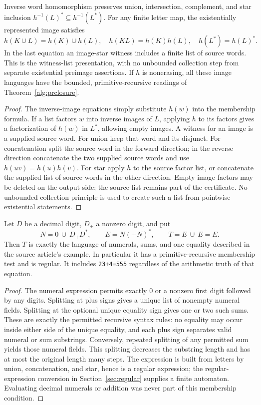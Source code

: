 \begin{theorem}
\label{alg:homlaws}
Inverse word homomorphism preserves union, intersection, complement, and
star inclusion $h^{-1}(L)^*\subseteq h^{-1}(L^*)$. For any finite letter
map, the existentially represented image satisfies
\[
 h(K\cup L)=h(K)\cup h(L),\quad h(KL)=h(K)h(L),\quad
 h(L^*)=h(L)^*.
\]
In the last equation an image-star witness includes a finite list of source
words. This is the witness-list presentation, with no unbounded collection
step from separate existential preimage assertions. If $h$ is nonerasing,
all these image languages have the bounded,
primitive-recursive readings of Theorem~\ref{alg:prclosure}.
\end{theorem}
\begin{proof}
The inverse-image equations simply substitute $h(w)$ into the membership
formula. If a list factors $w$ into inverse images of $L$, applying $h$
to its factors gives a factorization of $h(w)$ in $L^*$, allowing empty
images. A witness for an image is a supplied source word. For union keep
that word and its disjunct. For concatenation split the source word in the
forward direction; in the reverse direction concatenate the two supplied
source words and use $h(uv)=h(u)h(v)$.
For star apply $h$ to the source factor list, or concatenate the supplied
list of source words in the other direction. Empty image factors may be
deleted on the output side; the source list remains part of the certificate.
No unbounded collection principle is used to create such a list from
pointwise existential statements.
\end{proof}

\begin{proposition}
\label{alg:syntax}
Let $D$ be a decimal digit, $D_+$ a nonzero digit, and put
\[
 N=0\ \cup\ D_+D^*,\qquad E=N(\mathtt{+}N)^*,\qquad
 T=E\ \cup\ E\mathtt{=}E.
\]
Then $T$ is exactly the language of numerals, sums, and one equality
described in the source article's example. In particular it has a
primitive-recursive membership test and is regular. It includes
\texttt{23+4=555} regardless of the arithmetic truth of that equation.
\end{proposition}
\begin{proof}
The numeral expression permits exactly $0$ or a nonzero first digit
followed by any digits. Splitting at plus signs gives a unique list of
nonempty numeral fields. Splitting at the optional unique equality sign
gives one or two such sums. These are exactly the permitted recursive
syntax rules: no equality may occur inside either side of the unique
equality, and each plus sign separates valid numeral or sum substrings.
Conversely, repeated splitting of any permitted sum yields those numeral
fields. This splitting decreases the substring length and has at most
the original length many steps. The expression is built from letters by
union, concatenation, and star, hence is a regular expression; the
regular-expression conversion in Section~\ref{sec:regular} supplies a
finite automaton. Evaluating decimal numerals or addition was never part
of this membership condition.
\end{proof}
